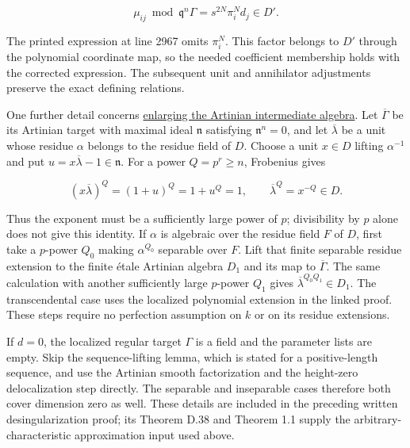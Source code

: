 \documentclass[11pt,a4paper,openany]{report}
\begin{document}
\[
\mu_{ij}\bmod\mathfrak q^n\Gamma=s^{2N}\pi_i^Nd_j\in D'.
\]

The printed expression at line 2967 omits \(\pi_i^N\). This factor belongs to \(D'\) through the polynomial coordinate map, so the needed coefficient membership holds with the corrected expression. The subsequent unit and annihilator adjustments preserve the exact defining relations.

One further detail concerns \href{https://github.com/KokunoYumeto/unofficial-stacks-project-ai-drafts/blob/565b10e987aba5969b21145a0833f42d69f96790/smoothing.tex\#L2642-L2669}{enlarging the Artinian intermediate algebra}. Let \(\overline\Gamma\) be its Artinian target with maximal ideal \(\mathfrak n\) satisfying \(\mathfrak n^n=0\), and let \(\overline\lambda\) be a unit whose residue \(\alpha\) belongs to the residue field of \(D\). Choose a unit \(x\in D\) lifting \(\alpha^{-1}\) and put \(u=x\overline\lambda-1\in\mathfrak n\). For a power \(Q=p^r\geq n\), Frobenius gives

\[
(x\overline\lambda)^Q=(1+u)^Q=1+u^Q=1,
\qquad \overline\lambda^Q=x^{-Q}\in D.
\]

Thus the exponent must be a sufficiently large power of \(p\); divisibility by \(p\) alone does not give this identity. If \(\alpha\) is algebraic over the residue field \(F\) of \(D\), first take a \(p\)-power \(Q_0\) making \(\alpha^{Q_0}\) separable over \(F\). Lift that finite separable residue extension to the finite étale Artinian algebra \(D_1\) and its map to \(\overline\Gamma\). The same calculation with another sufficiently large \(p\)-power \(Q_1\) gives \(\overline\lambda^{Q_0Q_1}\in D_1\). The transcendental case uses the localized polynomial extension in the linked proof. These steps require no perfection assumption on \(k\) or on its residue extensions.

If \(d=0\), the localized regular target \(\Gamma\) is a field and the parameter lists are empty. Skip the sequence-lifting lemma, which is stated for a positive-length sequence, and use the Artinian smooth factorization and the height-zero delocalization step directly. The separable and inseparable cases therefore both cover dimension zero as well. These details are included in the preceding written desingularization proof; its Theorem D.38 and Theorem 1.1 supply the arbitrary-characteristic approximation input used above.
\end{document}
